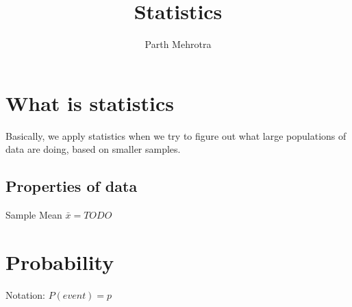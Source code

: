 \documentclass{article}
\title{Statistics}
\author{Parth Mehrotra}
\begin{document}
	\maketitle
	\newpage

	\section{What is statistics} 
		Basically, we apply statistics when we try to figure out what large populations of data are doing, based on smaller samples.
		\subsection{Properties of data}
			Sample Mean
			$\bar{x} = TODO $

	\section{Probability}
		Notation: 
		$P(event) = p$
\end{document}
